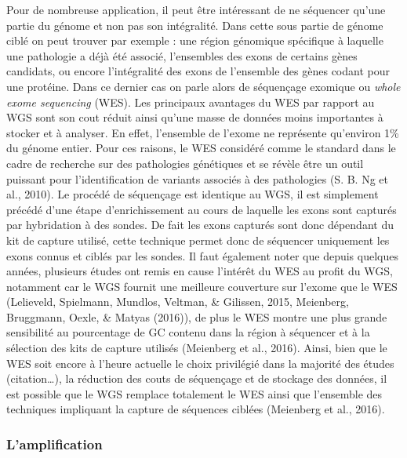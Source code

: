 \documentclass[12pt,twoside]{reedthesis}
\theoremstyle{definition}
\theoremstyle{definition}
\theoremstyle{remark}
\begin{document}
  Pour de nombreuse application, il peut être intéressant de ne séquencer
  qu'une partie du génome et non pas son intégralité. Dans cette sous
  partie de génome ciblé on peut trouver par exemple : une région
  génomique spécifique à laquelle une pathologie a déjà été associé,
  l'ensembles des exons de certains gènes candidats, ou encore
  l'intégralité des exons de l'ensemble des gènes codant pour une
  protéine. Dans ce dernier cas on parle alors de séquençage exomique ou
  \emph{whole exome sequencing} (WES). Les principaux avantages du WES par
  rapport au WGS sont son cout réduit ainsi qu'une masse de données moins
  importantes à stocker et à analyser. En effet, l'ensemble de l'exome ne
  représente qu'environ 1\% du génome entier. Pour ces raisons, le WES
  considéré comme le standard dans le cadre de recherche sur des
  pathologies génétiques et se révèle être un outil puissant pour
  l'identification de variants associés à des pathologies (S. B. Ng et
  al., 2010). Le procédé de séquençage est identique au WGS, il est
  simplement précédé d'une étape d'enrichissement au cours de laquelle les
  exons sont capturés par hybridation à des sondes. De fait les exons
  capturés sont donc dépendant du kit de capture utilisé, cette technique
  permet donc de séquencer uniquement les exons connus et ciblés par les
  sondes. Il faut également noter que depuis quelques années, plusieurs
  études ont remis en cause l'intérêt du WES au profit du WGS, notamment
  car le WGS fournit une meilleure couverture sur l'exome que le WES
  (Lelieveld, Spielmann, Mundlos, Veltman, \& Gilissen, 2015, Meienberg,
  Bruggmann, Oexle, \& Matyas (2016)), de plus le WES montre une plus
  grande sensibilité au pourcentage de GC contenu dans la région à
  séquencer et à la sélection des kits de capture utilisés (Meienberg et
  al., 2016). Ainsi, bien que le WES soit encore à l'heure actuelle le
  choix privilégié dans la majorité des études (citation\ldots{}), la
  réduction des couts de séquençage et de stockage des données, il est
  possible que le WGS remplace totalement le WES ainsi que l'ensemble des
  techniques impliquant la capture de séquences ciblées (Meienberg et al.,
  2016).
  
  \subsubsection{L'amplification}\label{lamplification}
  
\end{document}
